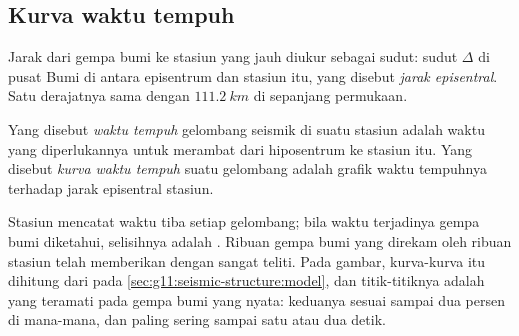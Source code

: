 \subsection{Kurva waktu tempuh}

Jarak dari gempa bumi ke stasiun yang jauh diukur sebagai sudut: sudut $\Delta$
di pusat Bumi di antara episentrum dan stasiun itu, yang disebut \emph{jarak
episentral}. Satu derajatnya sama dengan
$\qty{111.2}{km}$ di sepanjang permukaan.

\begin{definition}\label{def:g11:seismic-structure:travel-time}
Yang disebut \emph{waktu tempuh} gelombang seismik di suatu
stasiun adalah waktu yang diperlukannya untuk merambat dari hiposentrum ke
stasiun itu. Yang disebut \emph{kurva waktu tempuh}
suatu gelombang adalah grafik waktu tempuhnya terhadap jarak episentral stasiun.
\end{definition}

Stasiun mencatat waktu tiba setiap gelombang; bila waktu terjadinya gempa bumi
diketahui, selisihnya adalah . Ribuan gempa bumi yang direkam oleh
ribuan stasiun telah memberikan  dengan sangat teliti. Pada
gambar, kurva-kurva itu dihitung dari  pada
\cref{sec:g11:seismic-structure:model}, dan titik-titiknya adalah 
yang teramati pada gempa bumi yang nyata: keduanya sesuai sampai dua persen di
mana-mana, dan paling sering sampai satu atau dua detik.

